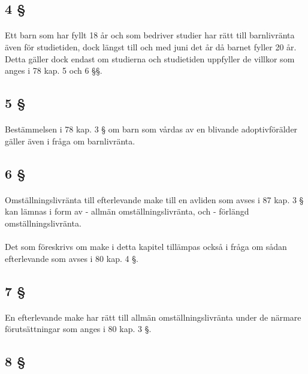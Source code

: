 \documentclass[a4paper,notitlepage,openany,10pt]{book}
\begin{document}
\subsection*{4 §}
\paragraph*{}
Ett barn som har fyllt 18 år och som bedriver studier har rätt till barnlivränta även för studietiden, dock längst till och med juni det år då barnet fyller 20 år. Detta gäller dock endast om studierna och studietiden uppfyller de villkor som anges i 78 kap. 5 och 6 §§.
\subsection*{5 §}
\paragraph*{}
Bestämmelsen i 78 kap. 3 § om barn som vårdas av en blivande adoptivförälder gäller även i fråga om barnlivränta.
\subsection*{6 §}
\paragraph*{}
Omställningslivränta till efterlevande make till en avliden som avses i 87 kap. 3 § kan lämnas i form av
\newline - allmän omställningslivränta, och
\newline - förlängd omställningslivränta.
\paragraph*{}
Det som föreskrivs om make i detta kapitel tillämpas också i fråga om sådan efterlevande som avses i 80 kap. 4 §.
\subsection*{7 §}
\paragraph*{}
En efterlevande make har rätt till allmän omställningslivränta under de närmare förutsättningar som anges i 80 kap. 3 §.
\subsection*{8 §}
\end{document}
